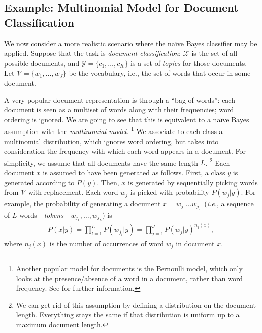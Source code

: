 \subsection{Example: Multinomial Model for Document Classification}

We now consider a more realistic scenario where the na\"ive Bayes classifier may be applied. 
Suppose that the task is \emph{document classification}: 
$\mathcal{X}$ is the set of all possible documents, and $\mathcal{Y}=\{c_1,\ldots,c_K\}$ is a set of \emph{topics} for those documents. 
Let $\mathcal{V} = \{w_1,\ldots,w_J\}$ be the vocabulary, i.e., the set of words that occur in some document. 

A very popular document representation is through a ``bag-of-words'': each document is seen as a multiset of words along with 
their frequencies; word ordering is ignored. We are going to see that this is equivalent to a na\"ive Bayes assumption 
with the \emph{multinomial model}.%
\footnote{Another popular model for documents is the Bernoulli model, which only looks at the presence/absence of a word in a 
document, rather than word frequency. See \cite{Manning2008,McCallum1998} for further information.} %
We associate to each class a multinomial distribution, which ignores word ordering, but takes into consideration the 
frequency with which each word appears in a document. For simplicity, we assume that all documents have the same length $L$.%
\footnote{We can get rid of this assumption by defining a distribution on the document length. Everything stays the same 
if that distribution is uniform up to a maximum document length.} %
Each document $x$ is assumed to have been generated as follows. First, a class $y$ is generated according to $P(y)$. Then, 
$x$ is generated by sequentially picking words from $\mathcal{V}$ with replacement. Each word $w_j$ is picked with probability $P(w_j|y)$. 
For example, the probability of generating a document $x = w_{j_1}\ldots w_{j_L}$ (\emph{i.e.}, a sequence of 
$L$ words---\emph{tokens}---$w_{j_1},\ldots,w_{j_L}$) is 
\begin{eqnarray}
P(x|y) = \prod_{l=1}^L P(w_{j_l}|y) = \prod_{j=1}^J P(w_j|y)^{n_j(x)},
\end{eqnarray}
where $n_j(x)$ is the number of occurrences of word $w_j$ in document $x$. 

